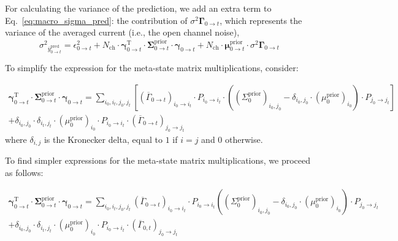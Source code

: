 \documentclass[pdflatex,sn-mathphys-num]{sn-jnl}%
\theoremstyle{thmstyleone}%
\theoremstyle{thmstyletwo}%
\theoremstyle{thmstylethree}%
\begin{document}
For calculating the variance of the prediction, we add an extra term to Eq.~\ref{eq:macro_sigma_pred}: the contribution of ${\sigma^2 \mathbf{\Gamma}}_{0 \rightarrow t}$, which represents the variance of the averaged current (i.e., the open channel noise),
\begin{equation}
	{\sigma^2}_{\overline{y}^{\mathrm{pred}}_{0 \rightarrow t}}
	= \epsilon^2_{0 \rightarrow t} + N_{\mathrm{ch}} \cdot \mathbf{\gamma}^{\mathrm{T}}_{0 \rightarrow t} \cdot \mathbf{\Sigma}^{\mathrm{prior}}_{0 \rightarrow t} \cdot \mathbf{\gamma}_{0 \rightarrow t}
	+ N_{\mathrm{ch}} \cdot \mathbf{\mu}^{\mathrm{prior}}_{0 \rightarrow t} \cdot {\sigma^2 \mathbf{\Gamma}}_{0 \rightarrow t}
	\label{eq:meta_macro_sigma_pred}
\end{equation}

To simplify the expression for the meta-state matrix multiplications, consider:

\begin{multline}
	\mathbf{\gamma}^{\mathrm{T}}_{0 \rightarrow t} \cdot \mathbf{\Sigma}^{\mathrm{prior}}_{0 \rightarrow t} \cdot \mathbf{\gamma}_{0 \rightarrow t} = 
	\sum_{i_0, i_t, j_0, j_t} 
	\left[ (\overline{\Gamma}_{0 \rightarrow t})_{i_0 \rightarrow i_t} \cdot P_{i_0 \rightarrow i_t} \cdot \left( (\Sigma^{\mathrm{prior}}_{0})_{i_0, j_0} - \delta_{i_0, j_0} \cdot (\mu^{\mathrm{prior}}_0)_{i_0} \right) \cdot P_{j_0 \rightarrow j_t} \right] \\
	+ \delta_{i_0, j_0} \cdot \delta_{i_t, j_t} \cdot (\mu^{\mathrm{prior}}_0)_{i_0} \cdot P_{i_0 \rightarrow i_t} \cdot (\overline{\Gamma}_{0 \rightarrow t})_{j_0 \rightarrow j_t}
	\label{eq:meta_state_cov_mult}
\end{multline}
where $\delta_{i, j}$ is the Kronecker delta, equal to $1$ if $i = j$ and $0$ otherwise.

To find simpler expressions for the meta-state matrix multiplications, we proceed as follows:

\begin{multline}
	\mathbf{\gamma}^{\mathrm{T}}_{0 \rightarrow t} \cdot \mathbf{\Sigma}^{\mathrm{prior}}_{0 \rightarrow t} \cdot \mathbf{\gamma}_{0 \rightarrow t} = 
	\sum_{i_0, i_t, j_0, j_t}
	(\overline{\Gamma}_{0 \rightarrow  t})_{i_0 \rightarrow i_t} \cdot 
	P_{i_0 \rightarrow i_t} \left((\Sigma^{\mathrm{prior}}_{0})_{i_0, j_0} - \delta_{i_0, j_0} \cdot (\mu^{\mathrm{prior}}_0)_{i_0} \right)  \cdot P_{j_0 \rightarrow j_t} \\
	+ \delta_{i_0, j_0} \cdot \delta_{i_t, j_t} \cdot (\mu^{\mathrm{prior}}_0)_{i_0} \cdot P_{i_0 \rightarrow i_t} 
	\cdot (\overline{\Gamma}_{0, t})_{j_0 \rightarrow j_t}
	\label{eq:meta_state_expansion}
\end{multline}
\end{document}
